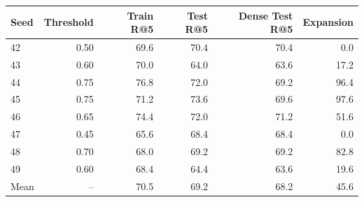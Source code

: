 \begin{tabular}{lrrrrr}
\toprule
Seed & Threshold & Train R@5 & Test R@5 & Dense Test R@5 & Expansion \\
\midrule
42 & 0.50 & 69.6 & 70.4 & 70.4 & 0.0 \\
43 & 0.60 & 70.0 & 64.0 & 63.6 & 17.2 \\
44 & 0.75 & 76.8 & 72.0 & 69.2 & 96.4 \\
45 & 0.75 & 71.2 & 73.6 & 69.6 & 97.6 \\
46 & 0.65 & 74.4 & 72.0 & 71.2 & 51.6 \\
47 & 0.45 & 65.6 & 68.4 & 68.4 & 0.0 \\
48 & 0.70 & 68.0 & 69.2 & 69.2 & 82.8 \\
49 & 0.60 & 68.4 & 64.4 & 63.6 & 19.6 \\
\midrule
Mean & -- & 70.5 & 69.2 & 68.2 & 45.6 \\
\bottomrule
\end{tabular}
